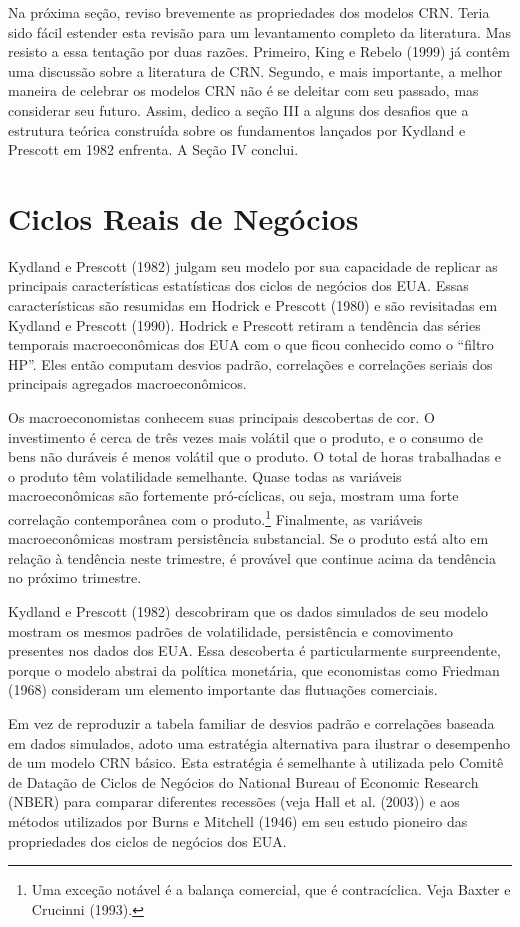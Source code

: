 \documentclass[12pt]{article}
\begin{document}
Na próxima seção, reviso brevemente as propriedades dos modelos CRN. Teria sido fácil estender esta revisão para um levantamento completo da literatura. Mas resisto a essa tentação por duas razões. Primeiro, King e Rebelo (1999) já contêm uma discussão sobre a literatura de CRN. Segundo, e mais importante, a melhor maneira de celebrar os modelos CRN não é se deleitar com seu passado, mas considerar seu futuro. Assim, dedico a seção III a alguns dos desafios que a estrutura teórica construída sobre os fundamentos lançados por Kydland e Prescott em 1982 enfrenta. A Seção IV conclui.

\section{Ciclos Reais de Negócios}

Kydland e Prescott (1982) julgam seu modelo por sua capacidade de replicar as principais características estatísticas dos ciclos de negócios dos EUA. Essas características são resumidas em Hodrick e Prescott (1980) e são revisitadas em Kydland e Prescott (1990). Hodrick e Prescott retiram a tendência das séries temporais macroeconômicas dos EUA com o que ficou conhecido como o “filtro HP”. Eles então computam desvios padrão, correlações e correlações seriais dos principais agregados macroeconômicos.

Os macroeconomistas conhecem suas principais descobertas de cor. O investimento é cerca de três vezes mais volátil que o produto, e o consumo de bens não duráveis é menos volátil que o produto. O total de horas trabalhadas e o produto têm volatilidade semelhante. Quase todas as variáveis macroeconômicas são fortemente pró-cíclicas, ou seja, mostram uma forte correlação contemporânea com o produto.\footnote{Uma exceção notável é a balança comercial, que é contracíclica. Veja Baxter e Crucinni (1993).} Finalmente, as variáveis macroeconômicas mostram persistência substancial. Se o produto está alto em relação à tendência neste trimestre, é provável que continue acima da tendência no próximo trimestre.

Kydland e Prescott (1982) descobriram que os dados simulados de seu modelo mostram os mesmos padrões de volatilidade, persistência e comovimento presentes nos dados dos EUA. Essa descoberta é particularmente surpreendente, porque o modelo abstrai da política monetária, que economistas como Friedman (1968) consideram um elemento importante das flutuações comerciais.

Em vez de reproduzir a tabela familiar de desvios padrão e correlações baseada em dados simulados, adoto uma estratégia alternativa para ilustrar o desempenho de um modelo CRN básico. Esta estratégia é semelhante à utilizada pelo Comitê de Datação de Ciclos de Negócios do National Bureau of Economic Research (NBER) para comparar diferentes recessões (veja Hall et al. (2003)) e aos métodos utilizados por Burns e Mitchell (1946) em seu estudo pioneiro das propriedades dos ciclos de negócios dos EUA.
\end{document}
